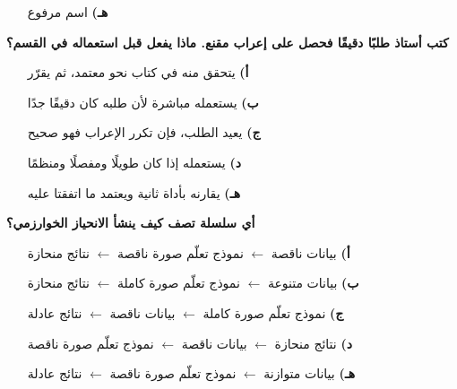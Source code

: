 \documentclass[11pt,a4paper]{article}
\begin{document}
\begin{multicols}{2}
\begin{minipage}{\linewidth}
\begin{itemize}[leftmargin=0.95cm, labelsep=4pt, itemsep=0pt, topsep=2pt, parsep=0pt]
  \item[\textbf{هـ)}] اسم مرفوع
\end{itemize}
\end{minipage}\par\vspace{7pt plus 4pt}
\noindent\begin{minipage}{\linewidth}
\hangindent=0.7cm\textbf{كتب أستاذ طلبًا دقيقًا فحصل على إعراب مقنع. ماذا يفعل قبل استعماله في القسم؟}
\begin{itemize}[leftmargin=0.95cm, labelsep=4pt, itemsep=0pt, topsep=2pt, parsep=0pt]
  \item[\textbf{أ)}] يتحقق منه في كتاب نحو معتمد، ثم يقرّر
  \item[\textbf{ب)}] يستعمله مباشرة لأن طلبه كان دقيقًا جدًا
  \item[\textbf{ج)}] يعيد الطلب، فإن تكرر الإعراب فهو صحيح
  \item[\textbf{د)}] يستعمله إذا كان طويلًا ومفصلًا ومنظمًا
  \item[\textbf{هـ)}] يقارنه بأداة ثانية ويعتمد ما اتفقتا عليه
\end{itemize}
\end{minipage}\par\vspace{7pt plus 4pt}
\noindent\begin{minipage}{\linewidth}
\hangindent=0.7cm\textbf{أي سلسلة تصف كيف ينشأ الانحياز الخوارزمي؟}
\begin{itemize}[leftmargin=0.95cm, labelsep=4pt, itemsep=0pt, topsep=2pt, parsep=0pt]
  \item[\textbf{أ)}] بيانات ناقصة $\leftarrow$ نموذج تعلّم صورة ناقصة $\leftarrow$ نتائج منحازة
  \item[\textbf{ب)}] بيانات متنوعة $\leftarrow$ نموذج تعلّم صورة كاملة $\leftarrow$ نتائج منحازة
  \item[\textbf{ج)}] نموذج تعلّم صورة كاملة $\leftarrow$ بيانات ناقصة $\leftarrow$ نتائج عادلة
  \item[\textbf{د)}] نتائج منحازة $\leftarrow$ بيانات ناقصة $\leftarrow$ نموذج تعلّم صورة ناقصة
  \item[\textbf{هـ)}] بيانات متوازنة $\leftarrow$ نموذج تعلّم صورة ناقصة $\leftarrow$ نتائج عادلة
\end{itemize}
\end{minipage}\par\vspace{7pt plus 4pt}
\noindent\begin{minipage}{\linewidth}

\end{minipage}
\end{multicols}
\end{document}
